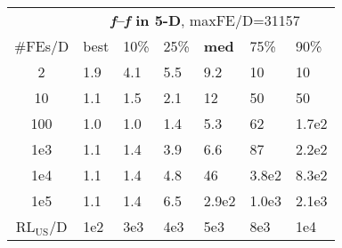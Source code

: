 \begin{tabular}{c|llllll}
 & \multicolumn{6}{|c}{\textbf{\textit{f}\raisebox{-0.35ex}{1}--\textit{f}\raisebox{-0.35ex}{24} in 5-D}, maxFE/D=31157}\\
\#FEs/D & best & 10\% & 25\% & \textbf{med} & 75\% & 90\%\\
2 & \hspace*{1ex}1.9 & \hspace*{1ex}4.1 & \hspace*{1ex}5.5 & \hspace*{1ex}9.2 & 10 & 10\\
10 & \hspace*{1ex}1.1 & \hspace*{1ex}1.5 & \hspace*{1ex}2.1 & 12 & 50 & 50\\
100 & \hspace*{1ex}1.0 & \hspace*{1ex}1.0 & \hspace*{1ex}1.4 & \hspace*{1ex}5.3 & 62 & 1.7e2\\
1e3 & \hspace*{1ex}1.1 & \hspace*{1ex}1.4 & \hspace*{1ex}3.9 & \hspace*{1ex}6.6 & 87 & 2.2e2\\
1e4 & \hspace*{1ex}1.1 & \hspace*{1ex}1.4 & \hspace*{1ex}4.8 & 46 & 3.8e2 & 8.3e2\\
1e5 & \hspace*{1ex}1.1 & \hspace*{1ex}1.4 & \hspace*{1ex}6.5 & 2.9e2 & 1.0e3 & 2.1e3\\
$\text{RL}_{\text{US}}$/D & 1e2 & 3e3 & 4e3 & 5e3 & 8e3 & 1e4
\end{tabular}
